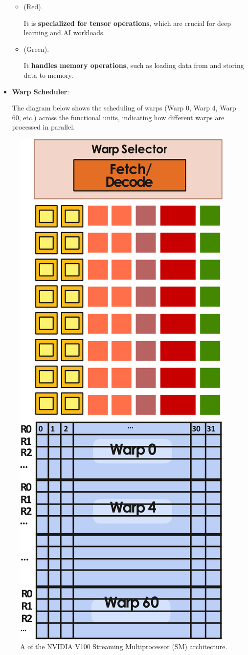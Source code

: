 \begin{itemize}
\begin{itemize}
        \item {} (Red). 
        
        It is \textbf{specialized for tensor operations}, which are crucial for deep learning and AI workloads.
        

        \item {} (Green). 
        
        It \textbf{handles memory operations}, such as loading data from and storing data to memory.
    \end{itemize}


    \item \textbf{Warp Scheduler}:

    The diagram below shows the scheduling of warps (Warp 0, Warp 4, Warp 60, etc.) across the functional units, indicating how different warps are processed in parallel.
\end{itemize}

\newpage

\begin{figure}[!htp]
    \centering
    \includegraphics[width=.4\textwidth]{img/nvidia-v100-sm-1.pdf}
    \caption{A  of the NVIDIA V100 Streaming Multiprocessor (SM) architecture.}
\end{figure}

